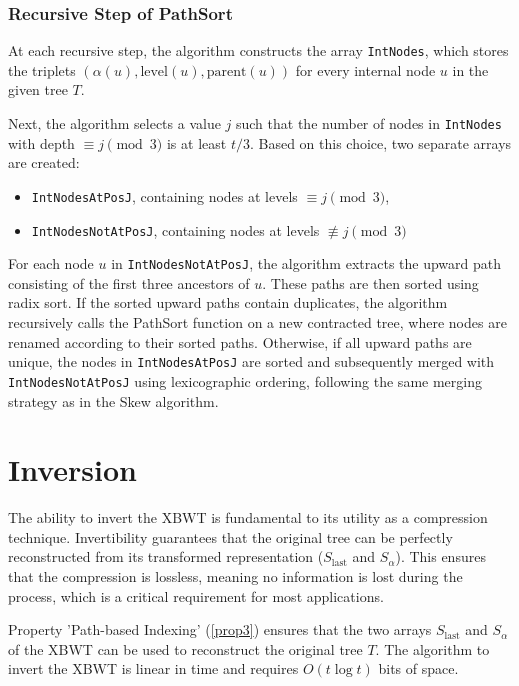 \subsubsection{Recursive Step of PathSort}
At each recursive step, the algorithm constructs the array \texttt{IntNodes}, which stores the triplets $(\alpha(u), \text{level}(u), \text{parent}(u))$ for every internal node $u$ in the given tree $T$.  

Next, the algorithm selects a value $j$ such that the number of nodes in \texttt{IntNodes} with depth $\equiv j \pmod{3}$ is at least $t/3$. Based on this choice, two separate arrays are created:  
\begin{itemize}
    \item \texttt{IntNodesAtPosJ}, containing nodes at levels $\equiv j \pmod{3}$,
    \item \texttt{IntNodesNotAtPosJ}, containing nodes at levels $\not\equiv j \pmod{3}$
\end{itemize}

For each node $u$ in \texttt{IntNodesNotAtPosJ}, the algorithm extracts the upward path consisting of the first three ancestors of $u$. These paths are then sorted using radix sort. If the sorted upward paths contain duplicates, the algorithm recursively calls the PathSort function on a new contracted tree, where nodes are renamed according to their sorted paths. Otherwise, if all upward paths are unique, the nodes in \texttt{IntNodesAtPosJ} are sorted and subsequently merged with \texttt{IntNodesNotAtPosJ} using lexicographic ordering, following the same merging strategy as in the Skew algorithm.

\section{Inversion}
The ability to invert the XBWT is fundamental to its utility as a compression technique. Invertibility guarantees that the original tree can be perfectly reconstructed from its transformed representation ($S_{\text{last}}$ and $S_{\alpha}$). This ensures that the compression is lossless, meaning no information is lost during the process, which is a critical requirement for most applications.

Property 'Path-based Indexing' (\cref{prop3}) ensures that the two arrays $S_{\text{last}}$ and $S_{\alpha}$ of the XBWT can be used to reconstruct the original tree $T$. The algorithm to invert the XBWT is linear in time and requires $O(t \log t)$ bits of space.

